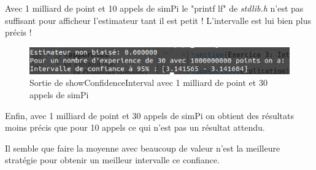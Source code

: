 \documentclass[12pt,french]{article} %
\begin{document}
Avec 1 milliard de point et 10 appels de simPi le "printf lf" de \textit{stdlib.h} n'est pas suffisant pour afficheur l'estimateur tant il est petit ! L'intervalle est lui bien plus précis !

\begin{figure}[H]
	\centering
	\includegraphics[scale=0.6]{exo3-2.png}
	\caption{Sortie de showConfidenceInterval avec 1 milliard de point et 30 appels de simPi}
\end{figure}

Enfin, avec 1 milliard de point et 30 appels de simPi on obtient des résultats moins précis que pour 10 appels ce qui n'est pas un résultat attendu.

Il semble que faire la moyenne avec beaucoup de valeur n'est la meilleure stratégie pour obtenir un meilleur intervalle ce confiance.


\listoffigures
\end{document}
